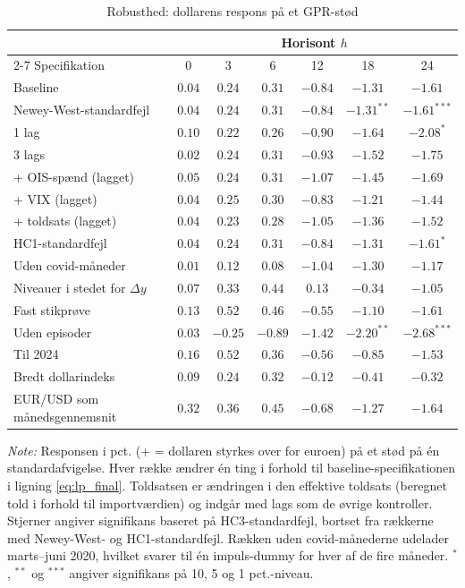 \begin{table}[H]
\centering
\caption{Robusthed: dollarens respons på et GPR-stød}
\label{tab:rob_gpr}
\begin{threeparttable}
\begin{tabular}{lcccccc}
\toprule
 & \multicolumn{6}{c}{Horisont $h$} \\
\cmidrule(lr){2-7}
Specifikation & 0 & 3 & 6 & 12 & 18 & 24 \\
\midrule
Baseline & $0.04$ & $0.24$ & $0.31$ & $-0.84$ & $-1.31$ & $-1.61$ \\
Newey-West-standardfejl & $0.04$ & $0.24$ & $0.31$ & $-0.84$ & $-1.31^{**}$ & $-1.61^{***}$ \\
1 lag & $0.10$ & $0.22$ & $0.26$ & $-0.90$ & $-1.64$ & $-2.08^{*}$ \\
3 lags & $0.02$ & $0.24$ & $0.31$ & $-0.93$ & $-1.52$ & $-1.75$ \\
+ OIS-spænd (lagget) & $0.05$ & $0.24$ & $0.31$ & $-1.07$ & $-1.45$ & $-1.69$ \\
+ VIX (lagget) & $0.04$ & $0.25$ & $0.30$ & $-0.83$ & $-1.21$ & $-1.44$ \\
+ toldsats (lagget) & $0.04$ & $0.23$ & $0.28$ & $-1.05$ & $-1.36$ & $-1.52$ \\
HC1-standardfejl & $0.04$ & $0.24$ & $0.31$ & $-0.84$ & $-1.31$ & $-1.61^{*}$ \\
Uden covid-måneder & $0.01$ & $0.12$ & $0.08$ & $-1.04$ & $-1.30$ & $-1.17$ \\
Niveauer i stedet for $\Delta y$ & $0.07$ & $0.33$ & $0.44$ & $0.13$ & $-0.34$ & $-1.05$ \\
Fast stikprøve & $0.13$ & $0.52$ & $0.46$ & $-0.55$ & $-1.10$ & $-1.61$ \\
Uden episoder & $0.03$ & $-0.25$ & $-0.89$ & $-1.42$ & $-2.20^{**}$ & $-2.68^{***}$ \\
Til 2024 & $0.16$ & $0.52$ & $0.36$ & $-0.56$ & $-0.85$ & $-1.53$ \\
Bredt dollarindeks & $0.09$ & $0.24$ & $0.32$ & $-0.12$ & $-0.41$ & $-0.32$ \\
EUR/USD som månedsgennemsnit & $0.32$ & $0.36$ & $0.45$ & $-0.68$ & $-1.27$ & $-1.64$ \\
\bottomrule
\end{tabular}
\begin{tablenotes}[flushleft]\footnotesize
\item \textit{Note:} Responsen i pct. (+ = dollaren styrkes over for euroen) på et stød på én standardafvigelse. Hver række ændrer én ting i forhold til baseline-specifikationen i ligning \eqref{eq:lp_final}. Toldsatsen er ændringen i den effektive toldsats (beregnet told i forhold til importværdien) og indgår med lags som de øvrige kontroller. Stjerner angiver signifikans baseret på HC3-standardfejl, bortset fra rækkerne med Newey-West- og HC1-standardfejl. Rækken uden covid-månederne udelader marts--juni 2020, hvilket svarer til én impuls-dummy for hver af de fire måneder. $^{*}$, $^{**}$ og $^{***}$ angiver signifikans på 10, 5 og 1 pct.-niveau.
\end{tablenotes}
\end{threeparttable}
\end{table}